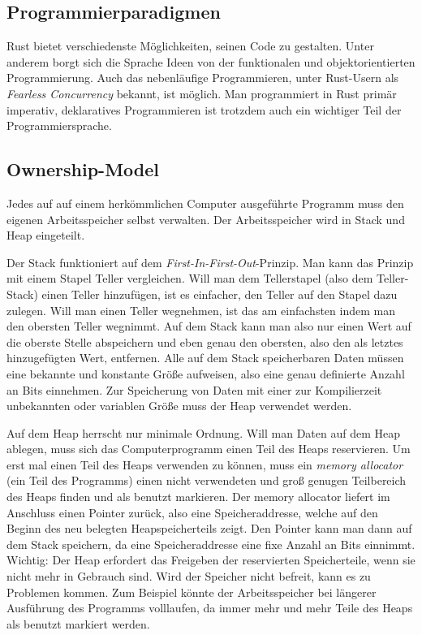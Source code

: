 \subsection{Programmierparadigmen}
Rust bietet verschiedenste Möglichkeiten, seinen Code zu gestalten. Unter
anderem borgt sich die Sprache Ideen von der funktionalen und objektorientierten
Programmierung. Auch das nebenläufige Programmieren, unter Rust-Usern als
\textit{Fearless Concurrency} bekannt, ist möglich. Man programmiert in Rust
primär imperativ, deklaratives Programmieren ist trotzdem auch ein wichtiger
Teil der Programmiersprache.

\subsection{Ownership-Model}
Jedes auf auf einem herkömmlichen Computer ausgeführte Programm muss den eigenen Arbeitsspeicher selbst verwalten.
Der Arbeitsspeicher wird in Stack und Heap eingeteilt. \cite{rustlangbookownership1}

Der Stack funktioniert auf dem \textit{First-In-First-Out}-Prinzip. Man kann das Prinzip mit einem Stapel Teller vergleichen.
Will man dem Tellerstapel (also dem Teller-Stack) einen Teller hinzufügen, ist es einfacher,
den Teller auf den Stapel dazu zulegen. Will man einen Teller wegnehmen, ist das am einfachsten indem man den obersten Teller wegnimmt.
Auf dem Stack kann man also nur einen Wert auf die oberste Stelle abspeichern und eben genau den obersten, also den als letztes hinzugefügten
Wert, entfernen. Alle auf dem Stack speicherbaren Daten müssen eine bekannte und konstante Größe aufweisen, also eine genau definierte Anzahl
an Bits einnehmen. Zur Speicherung von Daten mit einer zur Kompilierzeit unbekannten oder variablen Größe muss der Heap verwendet werden.

Auf dem Heap herrscht nur minimale Ordnung. Will man Daten auf dem Heap ablegen, muss sich das Computerprogramm einen Teil des Heaps
reservieren. Um erst mal einen Teil des Heaps verwenden zu können, muss ein \textit{memory allocator} (ein Teil des Programms) einen nicht
verwendeten und groß genugen Teilbereich des Heaps finden und als benutzt markieren. Der memory allocator liefert im Anschluss einen Pointer zurück,
also eine Speicheraddresse, welche auf den Beginn des neu belegten Heapspeicherteils zeigt. Den Pointer kann man dann auf dem Stack speichern, da eine
Speicheraddresse eine fixe Anzahl an Bits einnimmt. Wichtig: Der Heap erfordert das Freigeben der reservierten Speicherteile, wenn sie nicht
mehr in Gebrauch sind. Wird der Speicher nicht befreit, kann es zu Problemen kommen. Zum Beispiel könnte der Arbeitsspeicher bei längerer
Ausführung des Programms volllaufen, da immer mehr und mehr Teile des Heaps als benutzt markiert werden.

